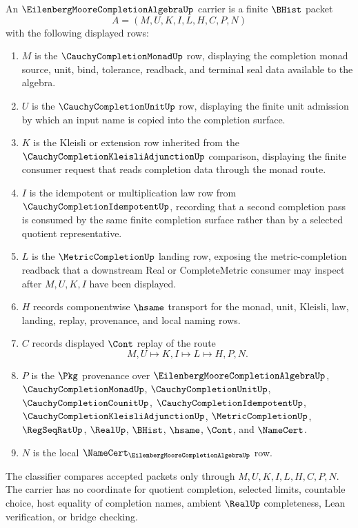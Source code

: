 \begin{definition}
\label{def:eilenberg-moore-completion-algebra-carrier}
An $\EilenbergMooreCompletionAlgebraUp$ carrier is a finite $\BHist$ packet
$$
A=(M,U,K,I,L,H,C,P,N)
$$
with the following displayed rows:
\begin{enumerate}
\item $M$ is the $\CauchyCompletionMonadUp$ row, displaying the completion monad source, unit, bind, tolerance, readback, and terminal seal data available to the algebra.
\item $U$ is the $\CauchyCompletionUnitUp$ row, displaying the finite unit admission by which an input name is copied into the completion surface.
\item $K$ is the Kleisli or extension row inherited from the $\CauchyCompletionKleisliAdjunctionUp$ comparison, displaying the finite consumer request that reads completion data through the monad route.
\item $I$ is the idempotent or multiplication law row from $\CauchyCompletionIdempotentUp$, recording that a second completion pass is consumed by the same finite completion surface rather than by a selected quotient representative.
\item $L$ is the $\MetricCompletionUp$ landing row, exposing the metric-completion readback that a downstream Real or CompleteMetric consumer may inspect after $M,U,K,I$ have been displayed.
\item $H$ records componentwise $\hsame$ transport for the monad, unit, Kleisli, law, landing, replay, provenance, and local naming rows.
\item $C$ records displayed $\Cont$ replay of the route
$$
M,U \longmapsto K,I \longmapsto L \longmapsto H,P,N .
$$
\item $P$ is the $\Pkg$ provenance over $\EilenbergMooreCompletionAlgebraUp$, $\CauchyCompletionMonadUp$, $\CauchyCompletionUnitUp$, $\CauchyCompletionCounitUp$, $\CauchyCompletionIdempotentUp$, $\CauchyCompletionKleisliAdjunctionUp$, $\MetricCompletionUp$, $\RegSeqRatUp$, $\RealUp$, $\BHist$, $\hsame$, $\Cont$, and $\NameCert$.
\item $N$ is the local $\NameCert_{\EilenbergMooreCompletionAlgebraUp}$ row.
\end{enumerate}
The classifier compares accepted packets only through $M,U,K,I,L,H,C,P,N$. The carrier has no coordinate for quotient completion, selected limits, countable choice, host equality of completion names, ambient $\RealUp$ completeness, Lean verification, or bridge checking.
\end{definition}

